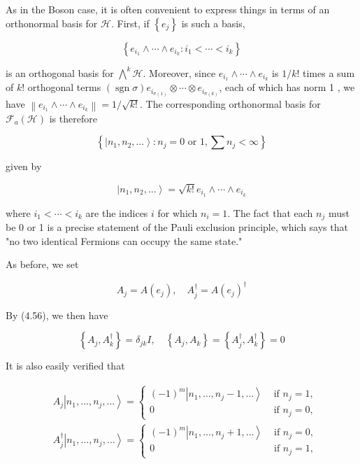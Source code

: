 \documentclass[10pt, letterpaper]{article}
\begin{document}
As in the Boson case, it is often convenient to express things in terms of an orthonormal basis for $\mathcal{H}$. First, if $\left\{e_{j}\right\}$ is such a basis,

$$
\left\{e_{i_{1}} \wedge \cdots \wedge e_{i_{k}}: i_{1}<\cdots<i_{k}\right\}
$$

is an orthogonal basis for $\bigwedge^{k} \mathcal{H}$. Moreover, since $e_{i_{1}} \wedge \cdots \wedge e_{i_{k}}$ is $1 / k!$ times a sum of $k!$ orthogonal terms $(\operatorname{sgn} \sigma) e_{i_{\sigma(1)}} \otimes \cdots \otimes e_{i_{\sigma(k)}}$, each of which has norm 1 , we have $\left\|e_{i_{1}} \wedge \cdots \wedge e_{i_{k}}\right\|=1 / \sqrt{k!}$. The corresponding orthonormal basis for $\mathcal{F}_{a}(\mathcal{H})$ is therefore

$$
\left\{\left|n_{1}, n_{2}, \ldots\right\rangle: n_{j}=0 \text { or } 1, \sum n_{j}<\infty\right\}
$$

given by

$$
\left|n_{1}, n_{2}, \ldots\right\rangle=\sqrt{k!} e_{i_{1}} \wedge \cdots \wedge e_{i_{k}}
$$

where $i_{1}<\cdots<i_{k}$ are the indices $i$ for which $n_{i}=1$. The fact that each $n_{j}$ must be 0 or 1 is a precise statement of the Pauli exclusion principle, which says that "no two identical Fermions can occupy the same state."

As before, we set

$$
A_{j}=A\left(e_{j}\right), \quad A_{j}^{\dagger}=A\left(e_{j}\right)^{\dagger}
$$

By (4.56), we then have

$$
\left\{A_{j}, A_{k}^{\dagger}\right\}=\delta_{j k} I, \quad\left\{A_{j}, A_{k}\right\}=\left\{A_{j}^{\dagger}, A_{k}^{\dagger}\right\}=0
$$

It is also easily verified that

$$
\begin{aligned}
& A_{j}\left|n_{1}, \ldots, n_{j}, \ldots\right\rangle= \begin{cases}(-1)^{m}\left|n_{1}, \ldots, n_{j}-1, \ldots\right\rangle & \text { if } n_{j}=1, \\
0 & \text { if } n_{j}=0,\end{cases} \\
& A_{j}^{\dagger}\left|n_{1}, \ldots, n_{j}, \ldots\right\rangle= \begin{cases}(-1)^{m}\left|n_{1}, \ldots, n_{j}+1, \ldots\right\rangle & \text { if } n_{j}=0, \\
0 & \text { if } n_{j}=1,\end{cases}
\end{aligned}
$$
\end{document}
